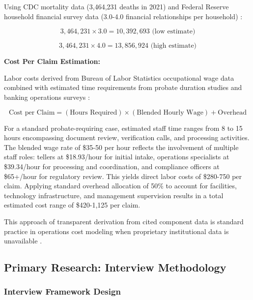Using CDC mortality data (3,464,231 deaths in 2021) \citep{murphy_deaths_2021} and Federal Reserve household financial survey data (3.0-4.0 financial relationships per household) \citep{federal_reserve_scf_2022}:

\begin{equation}
3,464,231 \times 3.0 = 10,392,693 \text{ (low estimate)}
\end{equation}

\begin{equation}
3,464,231 \times 4.0 = 13,856,924 \text{ (high estimate)}
\end{equation}

\textbf{Cost Per Claim Estimation:}

Labor costs derived from Bureau of Labor Statistics occupational wage data \citep{bls_tellers_2024} combined with estimated time requirements from probate duration studies \citep{trust_and_will_2024} and banking operations surveys \citep{aba_operations_2022}:

\begin{equation}
\text{Cost per Claim} = (\text{Hours Required}) \times (\text{Blended Hourly Wage}) + \text{Overhead}
\end{equation}

For a standard probate-requiring case, estimated staff time ranges from 8 to 15 hours encompassing document review, verification calls, and processing activities. The blended wage rate of \$35-50 per hour reflects the involvement of multiple staff roles: tellers at \$18.93/hour for initial intake, operations specialists at \$39.34/hour for processing and coordination, and compliance officers at \$65+/hour for regulatory review. This yields direct labor costs of \$280-750 per claim. Applying standard overhead allocation of 50\% to account for facilities, technology infrastructure, and management supervision results in a total estimated cost range of \$420-1,125 per claim.

This approach of transparent derivation from cited component data is standard practice in operations cost modeling when proprietary institutional data is unavailable \citep{banking_operations_study_2021}.

\subsection{Primary Research: Interview Methodology}

\subsubsection{Interview Framework Design}

